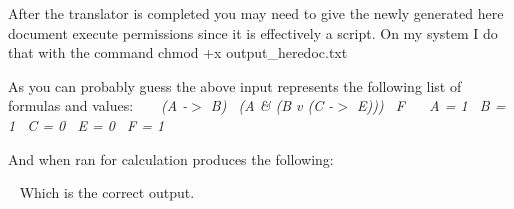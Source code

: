 After the translator is completed you may need to give the newly generated here document execute permissions since it is effectively a script. On my system I do that with the command \textquotesingle{}chmod +x output\+\_\+heredoc.\+txt\textquotesingle{}

As you can probably guess the above input represents the following list of formulas and values\+: ~\newline
 ~\newline
 {\itshape  {\ttfamily  (A -\/$>$ B)~\newline
 (A \& (B v (C -\/$>$ E)))~\newline
 F~\newline
 ~\newline
 A = 1~\newline
 B = 1~\newline
 C = 0~\newline
 E = 0~\newline
 F = 1~\newline
 } }

And when ran for calculation produces the following\+:

{ } ~\newline
 Which is the correct output. 